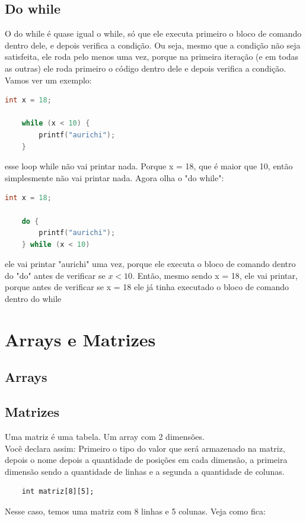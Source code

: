 \documentclass{article}
\begin{document}
\subsection{Do while}
O do while é quase igual o while, só que ele executa primeiro o bloco de comando dentro dele, e depois verifica a condição. Ou seja, mesmo que a condição não seja satisfeita, ele roda pelo menos uma vez, porque na primeira iteração (e em todas as outras) ele roda primeiro o código dentro dele e depois verifica a condição. Vamos ver um exemplo:
\begin{lstlisting}[language=C]
    int x = 18;
    
    while (x < 10) {
        printf("aurichi");
    }
\end{lstlisting}
esse loop while não vai printar nada. Porque x = 18, que é maior que 10, então simplesmente não vai printar nada. Agora olha o "do while":
\begin{lstlisting}[language=C]
    int x = 18;

    do {
        printf("aurichi");
    } while (x < 10)
\end{lstlisting}
ele vai printar "aurichi" uma vez, porque ele executa o bloco de comando dentro do "do" antes de verificar se $x < 10$. Então, mesmo sendo x = 18, ele vai printar, porque antes de verificar se x = 18 ele já tinha executado o bloco de comando dentro do while
\section{Arrays e Matrizes}

\subsection{Arrays}

\subsection{Matrizes}
Uma matriz é uma tabela. Um array com 2 dimensões. 
\\[3pt]
Você declara assim: Primeiro o tipo do valor que será armazenado na matriz, depois o nome depois a quantidade de posições em cada dimensão, a primeira dimensão sendo a quantidade de linhas e a segunda a quantidade de colunas.
\begin{lstlisting}
    int matriz[8][5];
\end{lstlisting}
Nesse caso, temos uma matriz com 8 linhas e 5 colunas. Veja como fica:
\end{document}

